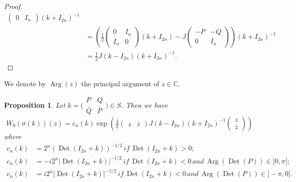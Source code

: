 \documentclass[12pt]{amsart}
\numberwithin{equation}{section}
\newtheorem{proposition}[theorem]{Proposition}
\DeclareMathOperator{\Det}{Det} \DeclareMathOperator{\Tr}{Tr}
\DeclareMathOperator{\Arg}{Arg}
\begin{document}
\begin{proof}
\begin{align*}
\begin{pmatrix}
0&I_n \end{pmatrix}(k+I_{2n})^{-1}\\
&=\left( \frac{1}{2}\begin{pmatrix} 0&I_n\\
I_n&0 \end{pmatrix}(k+I_{2n})-J\begin{pmatrix} -P&-Q\\
0&I_n \end{pmatrix}\right)(k+I_{2n})^{-1}\\
&=\frac{1}{2}J(k-I_{2n})(k+I_{2n})^{-1}.
\end{align*}
\end{proof}

We denote by $\Arg(z)$ the principal argument of $z\in {\mathbb C}$.

\begin{proposition} \label{propW0sigma} Let $k=\bigl(\begin{smallmatrix} P&Q\\
{\bar Q}&{\bar P} \end{smallmatrix}\bigr)\in S$. Then we have
\begin{equation*}W_0(\sigma(k))(z)=c_n(k) \exp \left( \tfrac{\lambda}{2}\begin{pmatrix}z&
{\bar z}\end{pmatrix}J(k-I_{2n})
(k+I_{2n})^{-1}\begin{pmatrix}z\\{\bar z}\end{pmatrix}\right)\end{equation*}
where 
\begin{align*}
c_n(k)&=2^n(\Det(I_{2n}+k))^{-1/2}\, if \, \Det(I_{2n}+k)>0;\\
c_n(k)&=-i2^n\vert \Det(I_{2n}+k)\vert^{-1/2}\, if \, \Det(I_{2n}+k)<0\, and\,
\Arg(\Det(P))\in ]0,\pi[ ;\\
c_n(k)&=i2^n\vert \Det(I_{2n}+k)\vert^{-1/2}\, if \, \Det(I_{2n}+k)<0\, and \,
\Arg(\Det(P))\in ]-\pi,0[.\end{align*}
\end{proposition}
\end{document}
